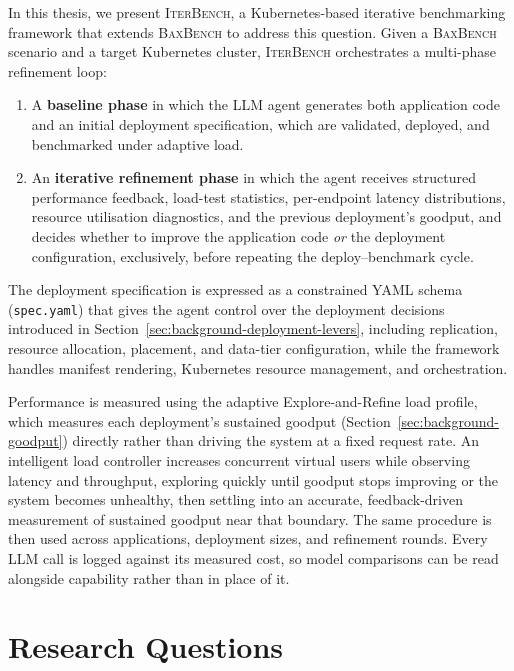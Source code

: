 In this thesis, we present \textsc{IterBench}, a Kubernetes-based iterative
benchmarking framework that extends \textsc{BaxBench} to address this
question.  Given a \textsc{BaxBench} scenario and a target Kubernetes cluster,
\textsc{IterBench} orchestrates a multi-phase refinement loop:
%
\begin{enumerate}
  \item A \textbf{baseline phase} in which the LLM agent generates both
        application code and an initial deployment specification, which are
        validated, deployed, and benchmarked under adaptive load.
  \item An \textbf{iterative refinement phase} in which the agent receives
        structured performance feedback, load-test statistics, per-endpoint
        latency distributions, resource utilisation diagnostics, and the
        previous deployment's goodput, and decides whether to improve the
        application code \emph{or} the deployment configuration, exclusively,
        before repeating the deploy--benchmark cycle.
\end{enumerate}
%
The deployment specification is expressed as a constrained YAML schema
(\texttt{spec.yaml}) that gives the agent control over the deployment decisions
introduced in Section~\ref{sec:background-deployment-levers}, including
replication, resource allocation, placement, and data-tier configuration,
while the framework handles manifest rendering, Kubernetes resource
management, and orchestration.

Performance is measured using the adaptive Explore-and-Refine load profile,
which measures each deployment's sustained goodput
(Section~\ref{sec:background-goodput}) directly rather than driving the
system at a fixed request rate. An intelligent load controller increases
concurrent virtual users while observing latency and throughput, exploring
quickly until goodput stops improving or the system becomes unhealthy, then
settling into an accurate, feedback-driven measurement of sustained goodput
near that boundary. The same procedure is then used across applications,
deployment sizes, and refinement rounds. Every LLM call is logged against its
measured cost, so model comparisons can be read alongside capability rather
than in place of it.


\section{Research Questions}
\label{sec:intro-rqs}

